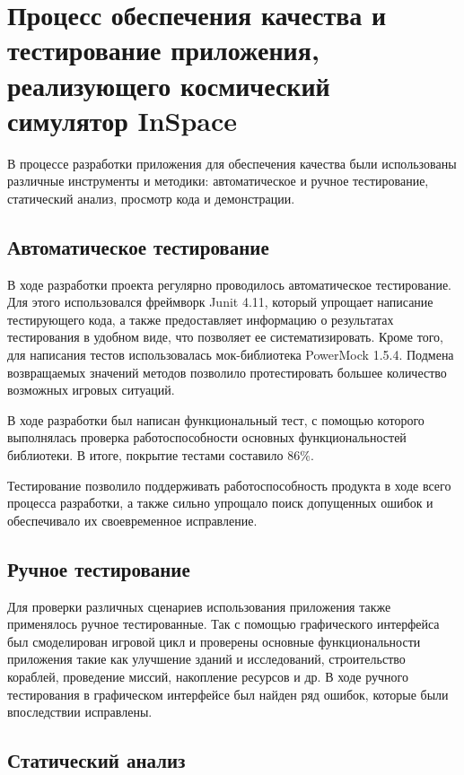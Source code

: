 \section{Процесс обеспечения качества и тестирование приложения, реализующего космический симулятор InSpace}

В процессе разработки приложения для обеспечения качества были использованы различные инструменты и методики: автоматическое и ручное тестирование, статический анализ, просмотр кода и демонстрации.

\subsection{Автоматическое тестирование}

В ходе разработки проекта регулярно проводилось автоматическое тестирование. Для этого использовался фреймворк Junit 4.11, который упрощает написание тестирующего кода, а также предоставляет информацию о результатах тестирования в удобном виде, что позволяет ее систематизировать. Кроме того, для написания тестов использовалась мок-библиотека PowerMock 1.5.4. Подмена возвращаемых значений методов позволило протестировать большее количество возможных игровых ситуаций. 

В ходе разработки был написан функциональный тест, с помощью которого выполнялась проверка работоспособности основных функциональностей библиотеки. В итоге, покрытие тестами составило 86\%.

Тестирование позволило поддерживать работоспособность продукта в ходе всего процесса разработки, а также сильно упрощало поиск допущенных ошибок и обеспечивало их своевременное исправление.   

\subsection{Ручное тестирование}
Для проверки различных сценариев использования приложения также применялось ручное тестированные. Так с помощью графического интерфейса был смоделирован игровой цикл и проверены основные функциональности приложения такие как улучшение зданий и исследований, строительство кораблей, проведение миссий, накопление ресурсов и др. В ходе ручного тестирования в графическом интерфейсе был найден ряд ошибок, которые были впоследствии исправлены. 

\subsection{Статический анализ}

